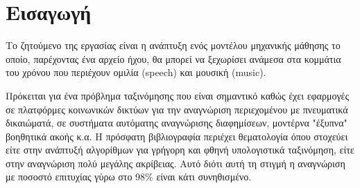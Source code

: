 \section{Εισαγωγή}

Το ζητούμενο της εργασίας είναι η ανάπτυξη ενός μοντέλου μηχανικής
μάθησης το οποίο, παρέχοντας ένα αρχείο ήχου, θα μπορεί να ξεχωρίσει
ανάμεσα στα κομμάτια του χρόνου που περιέχουν ομιλία (speech) και
μουσική (music).

Πρόκειται για ένα πρόβλημα ταξινόμησης που είναι σημαντικό καθώς έχει
εφαρμογές σε πλατφόρμες κοινωνικών δικτύων για την αναγνώριση
περιεχομένου με πνευματικά δικαιώματά, σε συστήματα αυτόματης
αναγνώρισης διαφημίσεων, μοντέρνα "έξυπνα" βοηθητικά ακοής κ.α. Η
πρόσφατη βιβλιογραφία περιέχει θεματολογία όπου στοχεύει είτε στην
ανάπτυξή αλγορίθμων για γρήγορη και φθηνή υπολογιστικά ταξινόμηση,
είτε στην αναγνώριση πολύ μεγάλης ακρίβειας. Αυτό διότι αυτή τη
στιγμή η αναγνώριση με ποσοστό επιτυχίας γύρω στο 98\% είναι κάτι
συνηθισμένο.